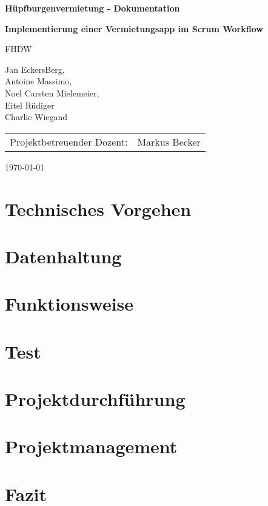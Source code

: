 \documentclass[12pt,titlepage]{article}
\author{Jan EckersBerg, Antoine Massimo, Noel Carsten Mielemeier, Eitel Rüdiger, Charlie Wiegand}
\begin{document}
	\begin{titlepage}
		\centering
		
		{\Huge\bfseries Hüpfburgenvermietung - Dokumentation}\par
		\vspace{0.5cm}
		{\Large\bfseries Implementierung einer Vermietungsapp im Scrum Workflow}
		\vspace{0.5cm}
		
		{\scshape\Large FHDW\par}
		\vspace{2cm}
	
		
		Jan EckersBerg,  \\
		Antoine Massimo,  \\
		Noel Carsten Mielemeier, \\ 
		Eitel Rüdiger \\ 
		Charlie Wiegand
		\vfill
		
		\begin{tabular}{rl}
			Projektbetreuender Dozent:      &      Markus Becker    \\
		\end{tabular}
		\vfill
		{\large \today\par}
	\end{titlepage}
	\tableofcontents
	\newpage

	\section{Technisches Vorgehen}
	\section{Datenhaltung}
	\section{Funktionsweise}
	\section{Test}
	\section{Projektdurchführung}
	\section{Projektmanagement}
	\section{Fazit}

	
	
\end{document}
